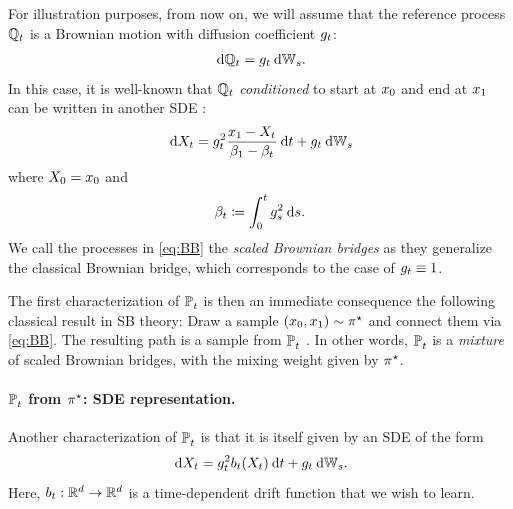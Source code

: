 For illustration purposes, from now on, we will assume that the reference process $\mathbb{Q}_{ t }$ is a Brownian motion with diffusion coefficient $g_{t}$:
\begin{equation}
\label{eq:gtWt}
\dd \refpro = \volat \dWiener.
\end{equation}
In this case, it is well-known that $\mathbb{Q}_{ t }$ \emph{conditioned} to start at $x_0$ and end at $x_1$ can be written in another \acrshort{SDE} \citep{mansuy2008aspects, liu2023learning}:
\begin{equation}
\label{eq:BB}
\dd X_t = \volatsq[\ctime] \frac{\x_1-X_t}{\cvolat[\horizon]-\cvolat[\ctime]} \dt + \volat\dWiener
\end{equation}
where $X_0 = x_0$ and %
\begin{equation}
\beta_{t}\coloneqq \int_0^t g^2_{ s } \:\mathrm{d} s.
\end{equation}We call the processes in \eqref{eq:BB} the \emph{scaled Brownian bridges} as they generalize the classical Brownian bridge, which corresponds to the case of $g_{t} \equiv 1$.

The first characterization of $\mathbb{P}^{}_{ t }$ is then an immediate consequence the following classical result in \acrlong{SB} theory: Draw a sample $(x_0, x_1) \sim \pi^\star$ and connect them via \eqref{eq:BB}. The resulting path is a sample from $\mathbb{P}^{}_{ t }$ \citep{leonard2013survey, chen2021stochastic}. In other words, $\mathbb{P}^{}_{ t }$ is a \emph{mixture} of scaled Brownian bridges, with the mixing weight given by $\pi^\star$.


\paragraph{$\mathbb{P}^{}_{ t }$ from $\pi^\star$: SDE representation.}



Another characterization of $\mathbb{P}^{}_{ t }$ is that it is itself given by an \acrshort{SDE} of the form \citep{leonard2013survey, chen2021stochastic}
\begin{equation}
\label{eq:SB-SDE}
\dd X_t = \volatsq[\ctime]\fdrift(X_t) \dt + \volat\dWiener.
\end{equation}
Here, $b_t: \mathbb{R}^d \to \mathbb{R}^d$ is a time-dependent drift function that we wish to learn.


